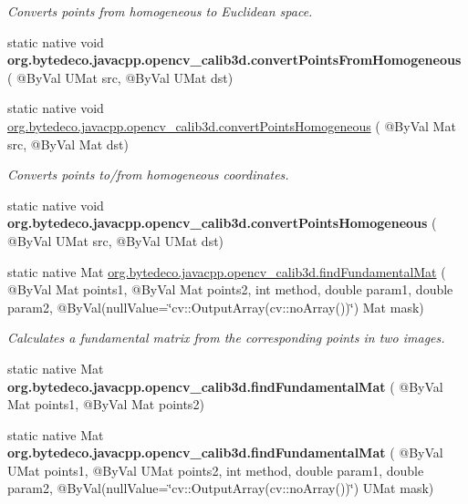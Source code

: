 \begin{DoxyCompactItemize}
\begin{DoxyCompactList}\small\item\em Converts points from homogeneous to Euclidean space. \end{DoxyCompactList}\item 
\mbox{\label{group__calib3d_gabf2ff428f08ba69073aff4ca97b0fbb5}} 
static native void {\bfseries org.\+bytedeco.\+javacpp.\+opencv\+\_\+calib3d.\+convert\+Points\+From\+Homogeneous} ( @By\+Val U\+Mat src, @By\+Val U\+Mat dst)
\item 
static native void \hyperlink{group__calib3d_gaaf02e05437bf63217e14cc47531a387b}{org.\+bytedeco.\+javacpp.\+opencv\+\_\+calib3d.\+convert\+Points\+Homogeneous} ( @By\+Val Mat src, @By\+Val Mat dst)
\begin{DoxyCompactList}\small\item\em Converts points to/from homogeneous coordinates. \end{DoxyCompactList}\item 
\mbox{\label{group__calib3d_ga24efba76ba1b1a6bf6b772ab10aaa846}} 
static native void {\bfseries org.\+bytedeco.\+javacpp.\+opencv\+\_\+calib3d.\+convert\+Points\+Homogeneous} ( @By\+Val U\+Mat src, @By\+Val U\+Mat dst)
\item 
static native Mat \hyperlink{group__calib3d_gaceb84b17990bba04533d8fe02ab1a1d2}{org.\+bytedeco.\+javacpp.\+opencv\+\_\+calib3d.\+find\+Fundamental\+Mat} ( @By\+Val Mat points1, @By\+Val Mat points2, int method, double param1, double param2, @By\+Val(null\+Value=\char`\"{}cv\+::\+Output\+Array(cv\+::no\+Array())\char`\"{}) Mat mask)
\begin{DoxyCompactList}\small\item\em Calculates a fundamental matrix from the corresponding points in two images. \end{DoxyCompactList}\item 
\mbox{\label{group__calib3d_ga030b3c357145df1498f53cf83f9441c4}} 
static native Mat {\bfseries org.\+bytedeco.\+javacpp.\+opencv\+\_\+calib3d.\+find\+Fundamental\+Mat} ( @By\+Val Mat points1, @By\+Val Mat points2)
\item 
\mbox{\label{group__calib3d_gac5615174bb8a07e52ce2ae6c518cff0c}} 
static native Mat {\bfseries org.\+bytedeco.\+javacpp.\+opencv\+\_\+calib3d.\+find\+Fundamental\+Mat} ( @By\+Val U\+Mat points1, @By\+Val U\+Mat points2, int method, double param1, double param2, @By\+Val(null\+Value=\char`\"{}cv\+::\+Output\+Array(cv\+::no\+Array())\char`\"{}) U\+Mat mask)

\end{DoxyCompactItemize}
